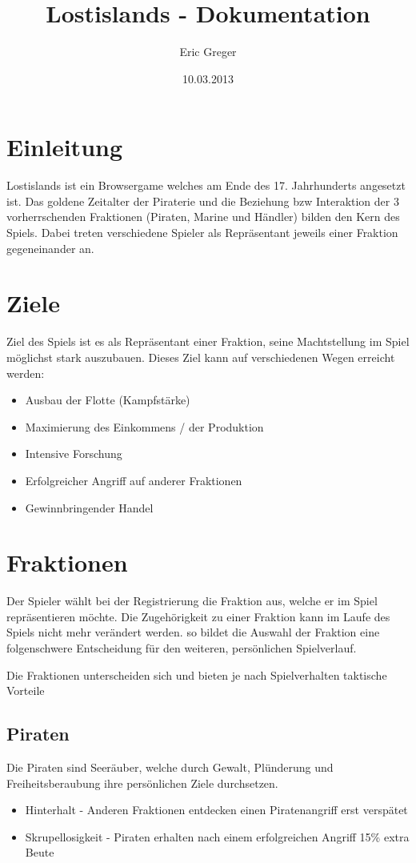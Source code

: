 \documentclass[10pt,a4paper]{article}
\begin{document}
\title{Lostislands - Dokumentation}
\author{Eric Greger}
\date{10.03.2013}
\pagebreak
\maketitle

\pagebreak
\tableofcontents
\pagebreak

\section{Einleitung}
Lostislands ist ein Browsergame welches am Ende des 17. Jahrhunderts angesetzt ist. Das goldene Zeitalter der Piraterie und die Beziehung bzw Interaktion der 3 vorherrschenden Fraktionen (Piraten, Marine und Händler) bilden den Kern des Spiels. Dabei treten verschiedene Spieler als Repräsentant jeweils einer Fraktion gegeneinander an.

\section{Ziele}
Ziel des Spiels ist es als Repräsentant einer Fraktion, seine Machtstellung im Spiel möglichst stark auszubauen. 
Dieses Ziel kann auf verschiedenen Wegen erreicht werden:
\begin{itemize}
\item Ausbau der Flotte (Kampfstärke)
\item Maximierung des Einkommens / der Produktion
\item Intensive Forschung
\item Erfolgreicher Angriff auf anderer Fraktionen
\item Gewinnbringender Handel
\end{itemize}

\section{Fraktionen}
Der Spieler wählt bei der Registrierung die Fraktion aus, welche er im Spiel repräsentieren möchte. Die Zugehörigkeit zu einer Fraktion kann im Laufe des Spiels nicht mehr verändert werden. so bildet die Auswahl der Fraktion eine folgenschwere Entscheidung für den weiteren, persönlichen Spielverlauf.

Die Fraktionen unterscheiden sich und bieten je nach Spielverhalten taktische Vorteile

\subsection{Piraten}
Die Piraten sind Seeräuber, welche durch Gewalt, Plünderung und Freiheitsberaubung ihre persönlichen Ziele durchsetzen.
\begin{itemize}
\item Hinterhalt - Anderen Fraktionen entdecken einen Piratenangriff erst verspätet
\item Skrupellosigkeit - Piraten erhalten nach einem erfolgreichen Angriff 15\% extra Beute
\end{itemize}
\end{document}
